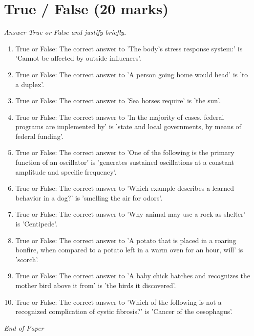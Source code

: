 \documentclass[12pt]{article}
\begin{document}
\section*{True / False (20 marks)}
\textit{Answer True or False and justify briefly.}
\begin{enumerate}[label=\arabic*.]
\item True or False: The correct answer to 'The body's stress response system:' is 'Cannot be affected by outside influences'.
\item True or False: The correct answer to 'A person going home would head' is 'to a duplex'.
\item True or False: The correct answer to 'Sea horses require' is 'the sun'.
\item True or False: The correct answer to 'In the majority of cases, federal programs are implemented by' is 'state and local governments, by means of federal funding'.
\item True or False: The correct answer to 'One of the following is the primary function of an oscillator' is 'generates sustained oscillations at a constant amplitude and specific frequency'.
\item True or False: The correct answer to 'Which example describes a learned behavior in a dog?' is 'smelling the air for odors'.
\item True or False: The correct answer to 'Why animal may use a rock as shelter' is 'Centipede'.
\item True or False: The correct answer to 'A potato that is placed in a roaring bonfire, when compared to a potato left in a warm oven for an hour, will' is 'scorch'.
\item True or False: The correct answer to 'A baby chick hatches and recognizes the mother bird above it from' is 'the birds it discovered'.
\item True or False: The correct answer to 'Which of the following is not a recognized complication of cystic fibrosis?' is 'Cancer of the oesophagus'.
\end{enumerate}

\vfill
\noindent\textit{End of Paper}
\end{document}
